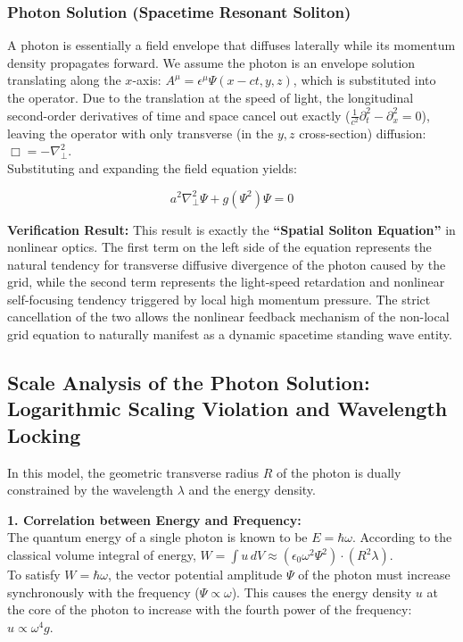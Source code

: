 \documentclass[12pt, a4paper]{article}
\begin{document}
\subsubsection{Photon Solution (Spacetime Resonant Soliton)}

A photon is essentially a field envelope that diffuses laterally while its momentum density propagates forward. We assume the photon is an envelope solution translating along the $x$-axis: $A^\mu = \epsilon^\mu \Psi(x-ct, y, z)$, which is substituted into the operator. Due to the translation at the speed of light, the longitudinal second-order derivatives of time and space cancel out exactly ($\frac{1}{c^2}\partial_t^2 - \partial_x^2 = 0$), leaving the operator with only transverse (in the $y,z$ cross-section) diffusion: $\Box = -\nabla_\perp^2$. \\
Substituting and expanding the field equation yields:

\begin{equation}
a^2 \nabla_\perp^2 \Psi + g(\Psi^2) \Psi = 0 
\end{equation}

\textbf{Verification Result:} This result is exactly the \textbf{``Spatial Soliton Equation''} in nonlinear optics. The first term on the left side of the equation represents the natural tendency for transverse diffusive divergence of the photon caused by the grid, while the second term represents the light-speed retardation and nonlinear self-focusing tendency triggered by local high momentum pressure. The strict cancellation of the two allows the nonlinear feedback mechanism of the non-local grid equation to naturally manifest as a dynamic spacetime standing wave entity.

\subsection{Scale Analysis of the Photon Solution: Logarithmic Scaling Violation and Wavelength Locking}

In this model, the geometric transverse radius $R$ of the photon is dually constrained by the wavelength $\lambda$ and the energy density.

\vspace{0.5em}
\noindent \textbf{1. Correlation between Energy and Frequency:} \\
The quantum energy of a single photon is known to be $E = \hbar\omega$. According to the classical volume integral of energy, $W = \int u \, dV \approx (\epsilon_0 \omega^2 \Psi^2) \cdot (R^2 \lambda)$. \\
To satisfy $W = \hbar\omega$, the vector potential amplitude $\Psi$ of the photon must increase synchronously with the frequency ($\Psi \propto \omega$). This causes the energy density $u$ at the core of the photon to increase with the fourth power of the frequency: $u \propto \omega^4 g$.
\end{document}
